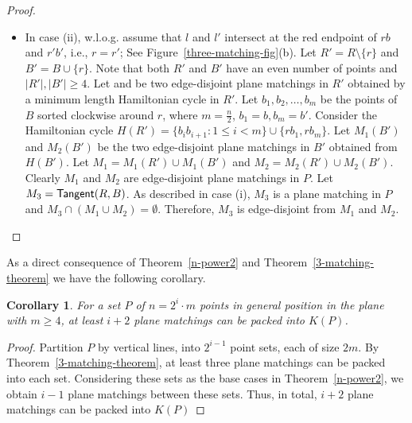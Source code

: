 \documentclass[11pt,a4paper]{article}
\newcommand{\HC}[1]{\text{$H(#1)$}}
\newcommand{\M}[2]{\text{$M_{#1}(#2)$}}
\newcommand{\Tangent}[2]{\text{\sf Tangent$(#1,#2)$}}
\newcommand{\Kn}[1]{K#1}
\newtheorem{corollary}{Corollary}
\begin{document}
\begin{proof}
\begin{itemize}
\item In case (ii), w.l.o.g. assume that $l$ and $l'$ intersect at the red endpoint of $rb$ and $r'b'$, i.e., $r=r'$; See Figure~\ref{three-matching-fig}(b). Let $R'=R\setminus \{r\}$ and $B'=B\cup \{r\}$. Note that both $R'$ and $B'$ have an even number of points and $|R'|,|B'|\ge 4$. Let \M{1}{R'} and \M{2}{R'} be two edge-disjoint plane matchings in $R'$ obtained by a minimum length Hamiltonian cycle in $R'$. Let $b_1, b_2, \dots, b_m$ be the points of $B$ sorted clockwise around $r$, where $m=\frac{n}{2}$, $b_1=b, b_m=b'$. Consider the Hamiltonian cycle $\HC{R'}=\{b_ib_{i+1}:1\le i< m\}\cup \{rb_1,rb_m\}$. Let $M_1(B')$ and $M_2(B')$ be the two edge-disjoint plane matchings in $B'$ obtained from $\HC{B'}$. Let $M_1=\M{1}{R'}\cup \M{1}{B'}$ and $M_2=\M{2}{R'}\cup \M{2}{B'}$. Clearly $M_1$ and $M_2$ are edge-disjoint plane matchings in $P$. Let $M_3=\Tangent{R}{B}$. As described in case (i), $M_3$ is a plane matching in $P$ and $M_3\cap (M_1\cup M_2)=\emptyset$. Therefore, $M_3$ is edge-disjoint from $M_1$ and $M_2$.
\end{itemize}
\end{proof}
As a direct consequence of Theorem~\ref{n-power2} and Theorem~\ref{3-matching-theorem} we have the following corollary.
\begin{corollary}
For a set $P$ of $n=2^i\cdot m$ points in general position in the plane with $m\ge 4$, at least $i+2$ plane matchings can be packed into $\Kn{(P)}$.
\end{corollary}
\begin{proof}
 Partition $P$ by vertical lines, into $2^{i-1}$ point sets, each of size $2m$. By Theorem~\ref{3-matching-theorem}, at least three plane matchings can be packed into each set. Considering these sets as the base cases in Theorem~\ref{n-power2}, we obtain $i-1$ plane matchings between these sets. Thus, in total, $i+2$ plane matchings can be packed into $\Kn{(P)}$
\end{proof}
\end{document}
